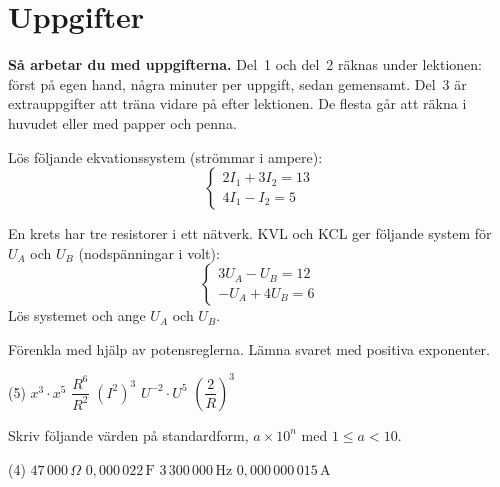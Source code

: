 
\section{Uppgifter}
\label{c5:sec:uppgifter}

\begin{aside}
\textbf{Så arbetar du med uppgifterna.} Del~1 och del~2 räknas under lektionen: först på egen
hand, några minuter per uppgift, sedan gemensamt. Del~3 är extrauppgifter att träna vidare på
efter lektionen. De flesta går att räkna i huvudet eller med papper och penna.

\end{aside}


Lös följande ekvationssystem (strömmar i ampere):
\[
  \begin{cases}
    2I_1 + 3I_2 = 13 \\
    4I_1 - I_2 = 5
  \end{cases}
\]

En krets har tre resistorer i ett nätverk. KVL och KCL ger följande system för $U_A$ och $U_B$
(nodspänningar i volt):
\[
  \begin{cases}
    3U_A - U_B = 12 \\
    -U_A + 4U_B = 6
  \end{cases}
\]
Lös systemet och ange $U_A$ och $U_B$.


Förenkla med hjälp av potensreglerna. Lämna svaret med positiva exponenter.
\begin{delar}(5)
  \task $x^3 \cdot x^5$
  \task $\dfrac{R^6}{R^2}$
  \task $(I^2)^3$
  \task $U^{-2} \cdot U^5$
  \task $\left(\dfrac{2}{R}\right)^3$
\end{delar}

Skriv följande värden på standardform, $a \times 10^n$ med $1 \leq a < 10$.
\begin{delar}(4)
  \task $47\,000\,\Omega$
  \task $0{,}000\,022\,\text{F}$
  \task $3\,300\,000\,\text{Hz}$
  \task $0{,}000\,000\,015\,\text{A}$
\end{delar}

